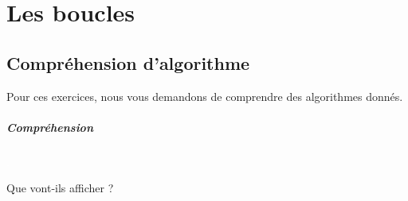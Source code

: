\documentclass[11pt,a4paper]{article}
\begin{document}
            \begin{abstract}
			Ces exercices ont pour but de v\'erifier que vous avez fix\'e les structures alternatives qui permettent de conditionner
      des parties d'algorithmes, de code.
		
            \par
        \end{abstract}
				\vspace{-2em}\tableofcontents
				\pagestyle{plain}
            \clearpage
            \fancyhead[L,C,R]{}
            \fancyfoot[L,C]{}
            \fancyfoot[R]{ \scriptsize{\textcolor{gray}{
				InitBoucle - page \thepage}}}
				\thispagestyle{fancy}
				\pagestyle{fancy}
	   
            \section{Les boucles}\subsection{Compr\'ehension d'algorithme}
          Pour ces exercices, nous vous demandons de comprendre des algorithmes donn\'es. 
          
			
		\subparagraph{Compr\'ehension} 
		
                \textcolor{white}{.} \par
            
							  Que vont-ils afficher ?
              
\end{document}

